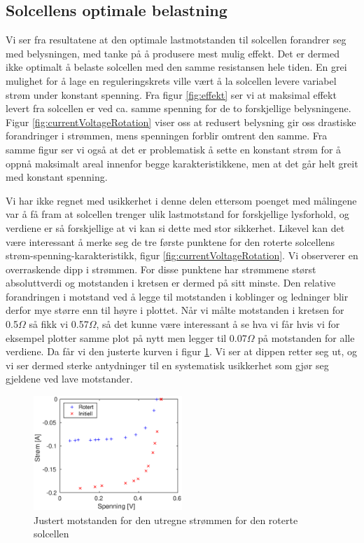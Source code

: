 \documentclass[a4paper,11pt, twocolumn]{article}
\begin{document}
\subsection{Solcellens optimale belastning}
Vi ser fra resultatene at den optimale lastmotstanden til solcellen forandrer seg med belysningen, med tanke på å produsere mest mulig effekt. Det er dermed ikke optimalt å belaste solcellen med den samme resistansen hele tiden. En grei mulighet for å lage en reguleringskrets ville vært å la solcellen levere variabel strøm under konstant spenning. Fra figur \ref{fig:effekt} ser vi at maksimal effekt levert fra solcellen er ved ca. samme spenning for de to forskjellige belysningene. Figur \ref{fig:currentVoltageRotation} viser oss at redusert belysning gir oss drastiske forandringer i strømmen, mens spenningen forblir omtrent den samme. Fra samme figur ser vi også at det er problematisk å sette en konstant strøm for å oppnå maksimalt areal innenfor begge karakteristikkene, men at det går helt greit med konstant spenning.

Vi har ikke regnet med usikkerhet i denne delen ettersom poenget med målingene var å få fram at solcellen trenger ulik lastmotstand for forskjellige lysforhold, og verdiene er så forskjellige at vi kan si dette med stor sikkerhet. Likevel kan det være interessant å merke seg de tre første punktene for den roterte solcellens strøm-spenning-karakteristikk, figur \ref{fig:currentVoltageRotation}. Vi observerer en overraskende dipp i strømmen. For disse punktene har strømmene størst absoluttverdi og motstanden i kretsen er dermed på sitt minste. Den relative forandringen i motstand ved å legge til motstanden i koblinger og ledninger blir derfor mye større enn til høyre i plottet. Når vi målte motstanden i kretsen for 0.5$\Omega$ så fikk vi 0.57$\Omega$, så det kunne være interessant å se hva vi får hvis vi for eksempel plotter samme plot på nytt men legger til 0.07$\Omega$ på motstanden for alle verdiene. Da får vi den justerte kurven i figur \ref{fig:justert}. Vi ser at dippen retter seg ut, og vi ser dermed sterke antydninger til en systematisk usikkerhet som gjør seg gjeldene ved lave motstander.  

\begin{figure}[!ht]
	\includegraphics[width = 0.5\textwidth]{matlab/LAB/justertRotert.eps}
	\caption{Justert motstanden for den utregne strømmen for den roterte solcellen}
	\label{fig:justert}
\end{figure}
\end{document}
